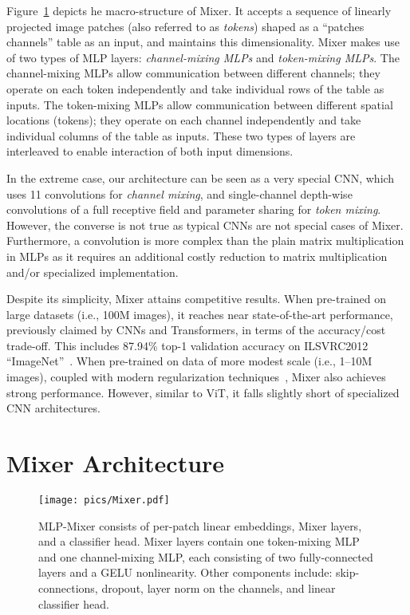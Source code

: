 \documentclass{article}
\newcommand{\fullname}{MLP-Mixer}
\newcommand{\name}{Mixer}
\begin{document}
Figure~\ref{fig:architecture} depicts he macro-structure of \name{}. 
It accepts a sequence of linearly projected image patches (also referred to as \emph{tokens}) shaped as a ``patches\,\,channels'' table as an input, and maintains this dimensionality.
\name{} makes use of two types of MLP layers:  \emph{channel-mixing MLPs} and \emph{token-mixing MLPs}. 
The channel-mixing MLPs allow communication between different channels; they operate on each token independently and take individual rows of the table as inputs.
The token-mixing MLPs allow communication between different spatial locations (tokens); they operate on each channel independently and take individual columns of the table as inputs.
These two types of layers are interleaved to enable interaction of both input dimensions.

In the extreme case, our architecture can be seen as a very special CNN, which uses 11 convolutions for \emph{channel mixing}, and single-channel depth-wise convolutions of a full receptive field and parameter sharing for \emph{token mixing}.
However, the converse is not true as typical CNNs are not special cases of \name{}. Furthermore, a convolution is more complex than the plain matrix multiplication in MLPs as it requires an additional costly reduction to matrix multiplication and/or specialized implementation. 

Despite its simplicity, \name{} attains competitive results.
When pre-trained on large datasets (i.e.,  100M images), it reaches near state-of-the-art performance, previously claimed by CNNs and Transformers, in terms of the accuracy/cost trade-off.
This includes 87.94\% top-1 validation accuracy on ILSVRC2012 ``ImageNet''~\citep{deng2009-imagenet}.
When pre-trained on data of more modest scale (i.e., 1--10M images), coupled with modern regularization techniques~\cite{deit,rw2019timm}, \name{} also achieves strong performance.
However, similar to ViT, it falls slightly short of specialized CNN architectures.

\section{\name{} Architecture}

\begin{figure}[tb]
    \centering
    \texttt{[image: pics/Mixer.pdf]}
    \caption{
     \fullname{} consists of per-patch linear embeddings, \name{} layers, and a classifier head.
     \name{} layers contain one token-mixing MLP and one channel-mixing MLP, each consisting of two fully-connected layers and a GELU nonlinearity.
     Other components include: skip-connections, dropout, layer norm on the channels, and linear classifier head.
    }
  \label{fig:architecture}
\end{figure}
\end{document}
